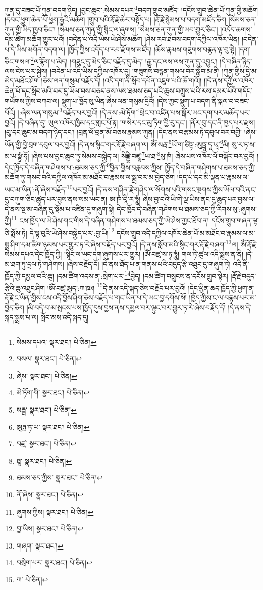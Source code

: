 ཀུན་དུ་བཟང་པོ་ཀུན་བདག་ཉིད། །བྱང་ཆུབ་:སེམས་དཔར་\footnote{སེམས་དཔའ་  སྣར་ཐང་།  པེ་ཅིན། }བདག་གྲུབ་མཛོད། །དངོས་གྲུབ་ཆེན་པོ་ཀུན་གྱི་མཆོག །དབང་ཕྱུག་ཆེན་པོ་ཕྱག་རྒྱའི་མཆོག །གྲུབ་པའི་རྡོ་རྗེ་ཆེར་བསྟོད་པ། །རྡོ་རྗེ་སྙེམས་པ་བདག་མཛོད་ཅིག །སེམས་ཅན་ཀུན་གྱི་ཡིད་ཁྱབ་ཅིང་། །སེམས་ཅན་ཀུན་གྱི་སྙིང་ལ་ཞུགས། །སེམས་ཅན་ཀུན་གྱི་ཡབ་གྱུར་ཅིང་། །འདོད་ཆགས་དམ་ཚིག་མཆོག་གྱུར་པའོ། །བདེན་པ་འདི་ཡིས་ཡེ་ཤེས་མཆོག །ཤེས་རབ་ཐབས་བདག་དཀྱིལ་འཁོར་ཡིན། །བདེན་པ་དེ་ཡིས་མགོན་བདག་ལ། །ཁྱོད་ཀྱིས་འདོད་པ་རབ་རྫོགས་མཛོད། །ཆོས་རྣམས་གཟུགས་བརྙན་ལྟ་བུ་སྟེ། །དག་ཅིང་གསལ་\footnote{བསལ་  སྣར་ཐང་།  པེ་ཅིན། }ལ་རྙོག་པ་མེད། །གཟུང་དུ་མེད་ཅིང་བརྗོད་དུ་མེད། །རྒྱུ་དང་ལས་ལས་ཀུན་དུ་འབྱུང་། །དེ་བཞིན་ཉིད་ལས་ངེས་པར་སྐྱེས། །བདེན་པ་འདི་ཡིས་དཀྱིལ་འཁོར་དུ། །གཟུགས་བརྙན་གསལ་བར་སློབ་མ་ནི། །ཀུན་གྱིས་དྲི་མ་མེད་མཐོང་ཤོག །ཅེས་ལན་གསུམ་བརྗོད་དོ། །འདི་དག་ནི་སློབ་དཔོན་འཇུག་པའི་ཆོ་གའོ།། །།དེ་ནས་དཀྱིལ་འཁོར་ཆེན་པོ་དང་སློབ་མའི་བར་དུ་ཡོལ་བས་བཅད་ནས་ལས་ཐམས་ཅད་པའི་ཆུས་བཀྲུས་པའི་རས་དམར་པོའི་གདོང་གཡོགས་ཀྱིས་བཀབ་ལ། སྡུག་པ་ཁྱོད་སུ་ཡིན་ཞེས་ལན་གསུམ་དྲིའོ། །དེས་ཀྱང་སྡུག་པ་བདག་ནི་སྐལ་བ་བཟང་པོའོ། །:ཞེས་ལན་གསུམ་\footnote{ཞེས་  སྣར་ཐང་།  པེ་ཅིན། }བརྗོད་པར་བྱའོ། །དེ་ནས་:མེ་ཏོག་\footnote{མེ་ཏོག་གི་  སྣར་ཐང་།  པེ་ཅིན། }ཕྲེང་བ་འཛིན་པས་སྒོར་ཡང་དག་པར་མཆོད་པར་བྱའོ། །དེ་བཞིན་དུ། ཡུལ་འཁོར་ཁྱིམ་དང་གླང་པོ་རྟ། །གསེར་དང་མུ་ཏིག་བྱི་རུ་དང་། །ནོར་བུ་དང་ནི་ཁྱད་པར་རྫས། །བུ་དང་ཆུང་མ་བདག་ཉིད་དང་། །བྲན་ཕོ་བྲན་མོ་བཅས་རྣམས་ཀུན། །དེང་ནས་བརྩམས་ཏེ་དབུལ་བར་བགྱི། །ཞེས་ཡོན་གྱི་བྱེ་བྲག་དབུལ་བར་བྱའོ། །དེ་ནས་སྙིང་གར་རྡོ་རྗེ་བཞག་ལ། ཨོཾ་སརྦ་\footnote{སརྦྦ་  སྣར་ཐང་།  པེ་ཅིན། }ཡོ་ག་ཙིཏྟ་:ཨུཏྤཱ་དཱ་ཡཱ་\footnote{ཨུཏྤ་ཏ་ཡ་  སྣར་ཐང་།  པེ་ཅིན། }མི། སུ་ར་ཏ་ས་མ་ཡ་སྟྭཾ་ཧོ། །ཞེས་པས་བྱང་ཆུབ་ཏུ་སེམས་བསྐྱེད་ལ། སིདྡྷི་བཛྲཱ་\footnote{བཛྲ་  སྣར་ཐང་།  པེ་ཅིན། }ཡ་ཐ་\footnote{ཐཱ་  སྣར་ཐང་།  པེ་ཅིན། }སུ་ཁཾ། ཞེས་པས་འཁོར་ལོ་བསྐོར་བར་བྱའོ། །དེང་ཁྱོད་དེ་བཞིན་གཤེགས་པ་:ཐམས་ཅད་ཀྱི་\footnote{ཐམས་ཅད་ཀྱིས་  སྣར་ཐང་།  པེ་ཅིན། }བྱིན་གྱིས་བརླབས་ཀྱིས། ཁྱོད་དེ་བཞིན་གཤེགས་པ་ཐམས་ཅད་ཀྱི་མཆོག་ཏུ་གསང་བའི་དཀྱིལ་འཁོར་མ་མཐོང་བ་རྣམས་ལ་སྨྲ་བར་མ་བྱེད་ཅིག །དད་པ་དང་མི་ལྡན་པ་རྣམས་ལ་ཡང་མ་ཡིན་:ནོ་ཞེས་བརྗོད་\footnote{ནོ་ཞེས་  སྣར་ཐང་།  པེ་ཅིན། }པར་བྱའོ། །དེ་ནས་གཤིན་རྗེ་གཤེད་ལ་སོགས་པའི་གསང་སྔགས་ཀྱིས་ཡོལ་བའི་ནང་དུ་བཀུག་ཅིང་ཚུད་པར་བྱས་ནས་སམ་ཡང་ན། ཨ་ཁཾ་བཱི་ར་ཧཱུཾ། ཞེས་བྱ་བའི་ཡི་གེ་ལྔ་ཡིས་ནང་དུ་ཆུད་པར་བྱས་ལ་དེ་ནས་སྔ་མ་བཞིན་དུ་སྡོམ་པ་འཛིན་དུ་གཞུག་སྟེ། དེང་ཁྱོད་དེ་བཞིན་གཤེགས་པ་ཐམས་ཅད་ཀྱི་རིགས་སུ་:ཞུགས་ཀྱི།\footnote{ཞུགས་ཀྱིས།  སྣར་ཐང་།  པེ་ཅིན། } ངས་ཁྱོད་ལ་ཡེ་ཤེས་གང་གིས་དེ་བཞིན་གཤེགས་པ་ཐམས་ཅད་ཀྱི་ཡེ་ཤེས་ཀྱང་ཐོབ་ན། དངོས་གྲུབ་གཞན་ལྟ་ཅི་སྨོས་ཏེ། དེ་ལྟ་བུའི་ཡེ་ཤེས་བསྐྱེད་པར་:བྱ་ཡི།\footnote{བྱ་ཡིས།  སྣར་ཐང་།  པེ་ཅིན། } དངོས་གྲུབ་འདི་དཀྱིལ་འཁོར་ཆེན་པོ་མ་མཐོང་བ་རྣམས་ལ་མ་སྨྲ་ཤིག་དམ་ཚིག་ཉམས་པར་གྱུར་ཏ་རེ་ཞེས་བརྗོད་པར་བྱའོ། །དེ་ནས་སློབ་མའི་སྙིང་གར་རྡོ་རྗེ་བཞག་\footnote{གཞག་  སྣར་ཐང་། }ལ། ཨོཾ་རྡོ་རྗེ་སེམས་དཔའ་དེང་ཁྱོད་ཀྱི། །སྙིང་ལ་ཡང་དག་ཞུགས་པར་གྱུར། །ཨོཾ་བཛྲ་ས་ཏྭ་ཧཱུཾ། གལ་ཏེ་ཚུལ་འདི་སྨྲས་ན་ནི། །དེ་མ་ཐག་ཏུ་དྲལ་ཏེ་གཤེགས། །ཞེས་བརྗོད་དོ། །དེ་ནས་ཐོད་པ་ན་གནས་པའི་བདུད་རྩི་འཐུང་དུ་གཞུག་ཏེ། འདི་ནི་ཁྱོད་ཀྱི་དམྱལ་བའི་ཆུ། །དམ་ཚིག་འདས་ན་:སྲེག་པར་\footnote{བསྲེག་པར་  སྣར་ཐང་།  པེ་ཅིན། }བྱེད། །དམ་ཚིག་བསྲུངས་ན་དངོས་གྲུབ་སྟེར། །རྡོ་རྗེ་བདུད་རྩིའི་ཆུ་འཐུང་ཤིག །ཨོཾ་བཛྲ་ཨུད་:ཀ་ཋཿ། \footnote{ཀ་  པེ་ཅིན། }དེ་ནས་འདི་སྐད་ཅེས་བརྗོད་པར་བྱའོ། །དེང་ཕྱིན་ཆད་ཁྱོད་ཀྱི་ཕྱག་ན་རྡོ་རྗེ་ང་ཡིན་གྱིས་ངས་འདི་བྱོས་ཤིག་ཅེས་བརྗོད་པ་གང་ཡིན་པ་དེ་ཡང་བྱ་དགོས་སོ། །ཁྱོད་ཀྱིས་ང་ལ་བརྙས་པར་མ་བྱེད་ཅིག །མི་བདེ་བ་མ་སྤངས་པས་ཁྱོད་དུས་བྱས་ནས་དམྱལ་བར་ལྟུང་བར་གྱུར་ཏ་རེ་ཞེས་བརྗོད་དོ། །དེ་ནས་དེ་སྐད་སྨྲས་པ་ལ། སློབ་མས་འདི་སྐད་དུ། 